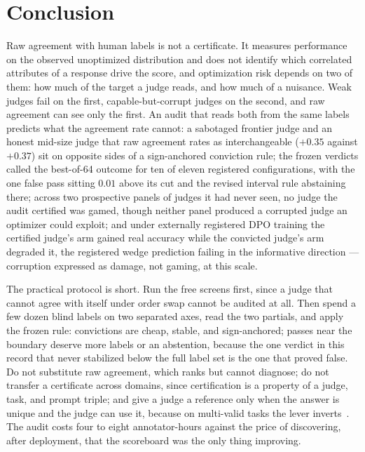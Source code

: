 \documentclass[11pt]{article}
\begin{document}
\section{Conclusion}

Raw agreement with human labels is not a certificate.
It measures performance on the observed unoptimized distribution and does not identify which correlated attributes of a response drive the score, and optimization risk depends on two of them: how much of the target a judge reads, and how much of a nuisance.
Weak judges fail on the first, capable-but-corrupt judges on the second, and raw agreement can see only the first.
An audit that reads both from the same labels predicts what the agreement rate cannot: a sabotaged frontier judge and an honest mid-size judge that raw agreement rates as interchangeable ($+0.35$ against $+0.37$) sit on opposite sides of a sign-anchored conviction rule; the frozen verdicts called the best-of-64 outcome for ten of eleven registered configurations, with the one false pass sitting $0.01$ above its cut and the revised interval rule abstaining there; across two prospective panels of judges it had never seen, no judge the audit certified was gamed, though neither panel produced a corrupted judge an optimizer could exploit; and under externally registered DPO training the certified judge's arm gained real accuracy while the convicted judge's arm degraded it, the registered wedge prediction failing in the informative direction --- corruption expressed as damage, not gaming, at this scale.

The practical protocol is short.
Run the free screens first, since a judge that cannot agree with itself under order swap cannot be audited at all.
Then spend a few dozen blind labels on two separated axes, read the two partials, and apply the frozen rule: convictions are cheap, stable, and sign-anchored; passes near the boundary deserve more labels or an abstention, because the one verdict in this record that never stabilized below the full label set is the one that proved false.
Do not substitute raw agreement, which ranks but cannot diagnose; do not transfer a certificate across domains, since certification is a property of a judge, task, and prompt triple; and give a judge a reference only when the answer is unique and the judge can use it, because on multi-valid tasks the lever inverts~\cite{companionD}.
The audit costs four to eight annotator-hours against the price of discovering, after deployment, that the scoreboard was the only thing improving.

\enlargethispage{4\baselineskip}
{\small


}
\end{document}
